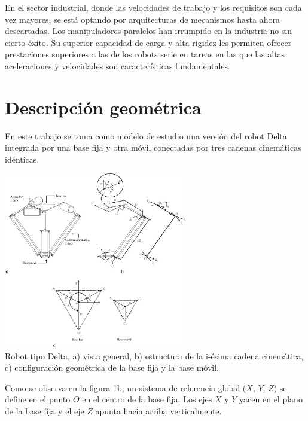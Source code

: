 \documentclass[11pt,a4paper,oldfontcommands,oneside]{memoir}
\begin{document}
En el sector industrial, donde las velocidades de trabajo y los requisitos son cada vez mayores, se está optando por arquitecturas de mecanismos hasta ahora descartadas. Los manipuladores paralelos han irrumpido en la industria no sin cierto éxito. Su superior capacidad de carga y alta rigidez les permiten ofrecer prestaciones superiores a las de los robots serie en tareas en las que las altas aceleraciones y velocidades son características fundamentales.\\

\section{Descripción geométrica}
En este trabajo se toma como modelo de estudio una versión del robot Delta integrada por una base fija y otra móvil conectadas por tres cadenas cinemáticas idénticas.\\

\begin{center}
\includegraphics[width=8cm]{3.jpg}
\\
Robot tipo Delta, a) vista general, b) estructura de la i-ésima cadena cinemática, c) configuración geométrica de la base fija y la base móvil.\\
\end{center}

Como se observa en la figura 1b, un sistema de referencia global ($X$, $Y$, $Z$) se define en el punto $O$ en el centro de la base fija. Los ejes $X$ y $Y$ yacen en el plano de la base fija y el eje $Z$ apunta hacia arriba verticalmente. \\




\end{document}
